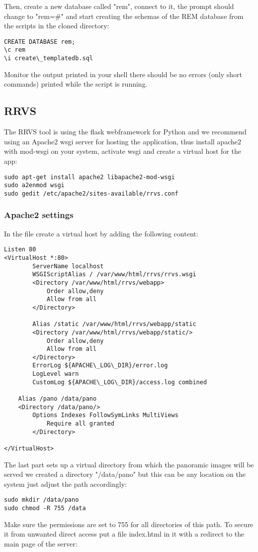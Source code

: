 \documentclass{article}
\begin{document}
Then, create a new database called "rem", connect to it, the prompt
should change to "rem=\#" and
start creating the schemas of the REM database from the scripts 
in the cloned directory:
\begin{verbatim}
CREATE DATABASE rem;
\c rem
\i create\_templatedb.sql
\end{verbatim}
Monitor the output printed in your shell there should be no errors
(only short commands) printed while the script is running.

\subsection{RRVS}
The RRVS tool is using the flask webframework for Python and we 
recommend using an Apache2 wsgi server for hosting the application,
thus install apache2 with mod-wsgi on your system, activate wsgi
and create a virtual host for the app:
\begin{verbatim}
sudo apt-get install apache2 libapache2-mod-wsgi
sudo a2enmod wsgi
sudo gedit /etc/apache2/sites-available/rrvs.conf
\end{verbatim}

\subsubsection{Apache2 settings}
In the file create a virtual host by adding the following content:
\begin{verbatim}
Listen 80  
<VirtualHost *:80>  
        ServerName localhost  
        WSGIScriptAlias / /var/www/html/rrvs/rrvs.wsgi  
        <Directory /var/www/html/rrvs/webapp>  
            Order allow,deny  
            Allow from all  
        </Directory>
  
        Alias /static /var/www/html/rrvs/webapp/static  
        <Directory /var/www/html/rrvs/webapp/static/>  
            Order allow,deny  
            Allow from all  
        </Directory>  
        ErrorLog ${APACHE\_LOG\_DIR}/error.log  
        LogLevel warn  
        CustomLog ${APACHE\_LOG\_DIR}/access.log combined  
	
	Alias /pano /data/pano                           
	<Directory /data/pano/>       
 	    Options Indexes FollowSymLinks MultiViews
     	    Require all granted
        </Directory>

</VirtualHost>
\end{verbatim}

The last part sets up a virtual directory from which the panoramic
images will be served we created a directory "/data/pano" but this
can be any location on the system just adjust the path accordingly:
\begin{verbatim}
sudo mkdir /data/pano
sudo chmod -R 755 /data
\end{verbatim}
Make sure the permissions are set to 755 for all directories of 
this path. To secure it from unwanted direct access put a 
file index.html in it with a redirect to the main page of the server:
\end{document}
